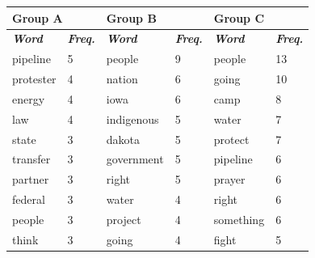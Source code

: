 \begin{table}[H]
\begin{footnotesize}
\centering
\begin{tabular}{|l|l|l|l|l|l|}

\hline
\multicolumn{2}{|l|}{\textbf{Group A}}           & \multicolumn{2}{l|}{\textbf{Group B}}            & \multicolumn{2}{l|}{\textbf{Group C}}            \\ \hline
\textit{\textbf{Word}} & \textit{\textbf{Freq.}} & \textit{\textbf{Word}} & \textit{\textbf{Freq.}} & \textit{\textbf{Word}} & \textit{\textbf{Freq.}} \\ \hline
pipeline              & 5                       & people                 & 9                       & people                 & 13                      \\ \hline
protester                 & 4                       & nation                 & 6                       & going                  & 10                      \\ \hline
energy                    & 4                       & iowa                   & 6                       & camp                   & 8                       \\ \hline
law                  & 4                       & indigenous             & 5                       & water                  & 7                       \\ \hline
state               & 3                       & dakota                 & 5                       & protect                & 7                       \\ \hline
transfer                & 3                       & government             & 5                       & pipeline               & 6                       \\ \hline
partner                & 3                       & right                  & 5                       & prayer                 & 6                       \\ \hline
federal                 & 3                       & water                  & 4                       & right                  & 6                       \\ \hline
people                  & 3                       & project                & 4                       & something              & 6                       \\ \hline
think                 & 3                       & going                  & 4                       & fight                  & 5                       \\ \hline

\end{tabular}
\end{footnotesize}
\end{table}
